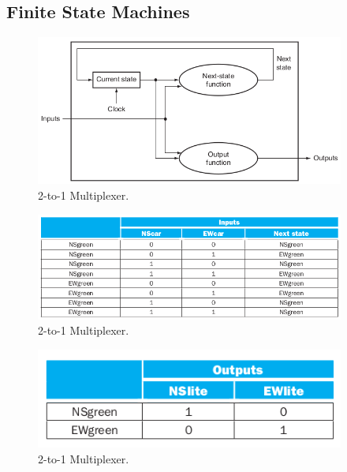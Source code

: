 \documentclass[a4paper, 11pt,oneside]{article}
\begin{document}
\subsection{Finite State Machines}

\begin{figure}[H]
	\begin{center}
	\includegraphics[width=4in]{fsm0.png}
	\caption{2-to-1 Multiplexer.}
	\label{fig:mux} 
	\end{center}
\end{figure}

\begin{figure}[H]
	\begin{center}
	\includegraphics[width=4in]{fsm1.png}
	\caption{2-to-1 Multiplexer.}
	\label{fig:mux} 
	\end{center}
\end{figure}

\begin{figure}[H]
	\begin{center}
	\includegraphics[width=4in]{fsm2.png}
	\caption{2-to-1 Multiplexer.}
	\label{fig:mux} 
	\end{center}
\end{figure}
\end{document}
